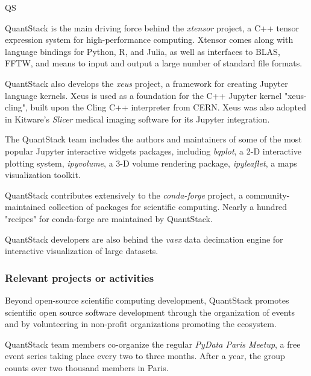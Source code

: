 \begin{sitedescription}{QS}
\begin{compactenum}
\item QuantStack is the main driving force behind the \emph{xtensor} project, a C++ tensor expression system for high-performance computing. Xtensor comes along with language bindings for Python, R, and Julia, as well as interfaces to BLAS, FFTW, and means to input and output a large number of standard file formats.

\item QuantStack also develops the \emph{xeus} project, a framework for creating Jupyter language kernels. Xeus is used as a foundation for the C++ Jupyter kernel "xeus-cling", built upon the Cling C++ interpreter from CERN. Xeus was also adopted in Kitware's \emph{Slicer} medical imaging software for its Jupyter integration.

\item The QuantStack team includes the authors and maintainers of some of the most popular Jupyter interactive widgets packages, including \emph{bqplot}, a 2-D interactive plotting system, \emph{ipyvolume}, a 3-D volume rendering package, \emph{ipyleaflet}, a maps visualization toolkit.

\item QuantStack contributes extensively to the \emph{conda-forge} project, a community-maintained collection of packages for scientific computing. Nearly a hundred "recipes" for conda-forge are maintained by QuantStack.

\item QuantStack developers are also behind the \emph{vaex} data decimation engine for interactive visualization of large datasets.

\end{compactenum}

\subsubsection*{Relevant projects or activities}

\par Beyond open-source scientific computing development, QuantStack promotes scientific open source software development through the organization of events and by volunteering in non-profit organizations promoting the ecosystem.

\begin{compactenum}

\item QuantStack team members co-organize the regular \emph{PyData Paris Meetup}, a free event series taking place every two to three months. After a year, the group counts over two thousand members in Paris.


\end{compactenum}
\end{sitedescription}
